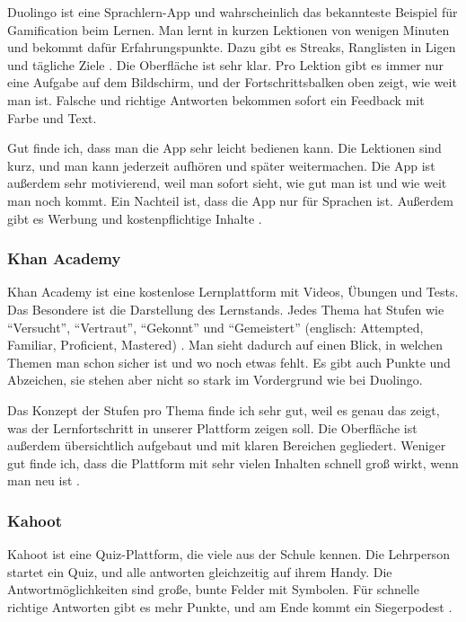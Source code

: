 Duolingo ist eine Sprachlern-App und wahrscheinlich das bekannteste Beispiel für Gamification beim Lernen. Man lernt in kurzen Lektionen von wenigen Minuten und bekommt dafür Erfahrungspunkte. Dazu gibt es Streaks, Ranglisten in Ligen und tägliche Ziele \parencite{duolingo101,duolingoLigen2026}. Die Oberfläche ist sehr klar. Pro Lektion gibt es immer nur eine Aufgabe auf dem Bildschirm, und der Fortschrittsbalken oben zeigt, wie weit man ist. Falsche und richtige Antworten bekommen sofort ein Feedback mit Farbe und Text.
 
Gut finde ich, dass man die App sehr leicht bedienen kann. Die Lektionen sind kurz, und man kann jederzeit aufhören und später weitermachen. Die App ist außerdem sehr motivierend, weil man sofort sieht, wie gut man ist und wie weit man noch kommt. Ein Nachteil ist, dass die App nur für Sprachen ist. Außerdem gibt es Werbung und kostenpflichtige Inhalte \parencite{superDuolingo}.
 
\subsubsection{Khan Academy}
 
Khan Academy ist eine kostenlose Lernplattform mit Videos, Übungen und Tests. Das Besondere ist die Darstellung des Lernstands. Jedes Thema hat Stufen wie \enquote{Versucht}, \enquote{Vertraut}, \enquote{Gekonnt} und \enquote{Gemeistert} (englisch: Attempted, Familiar, Proficient, Mastered) \parencite{khanMastery2026}. Man sieht dadurch auf einen Blick, in welchen Themen man schon sicher ist und wo noch etwas fehlt. Es gibt auch Punkte und Abzeichen, sie stehen aber nicht so stark im Vordergrund wie bei Duolingo.
 
Das Konzept der Stufen pro Thema finde ich sehr gut, weil es genau das zeigt, was der Lernfortschritt in unserer Plattform zeigen soll. Die Oberfläche ist außerdem übersichtlich aufgebaut und mit klaren Bereichen gegliedert. Weniger gut finde ich, dass die Plattform mit sehr vielen Inhalten schnell groß wirkt, wenn man neu ist \parencite{khanacademy2026}.
 
 
\subsubsection{Kahoot}
 
Kahoot ist eine Quiz-Plattform, die viele aus der Schule kennen. Die Lehrperson startet ein Quiz, und alle antworten gleichzeitig auf ihrem Handy. Die Antwortmöglichkeiten sind große, bunte Felder mit Symbolen. Für schnelle richtige Antworten gibt es mehr Punkte, und am Ende kommt ein Siegerpodest \parencite{kahootPoints2026}.
 
